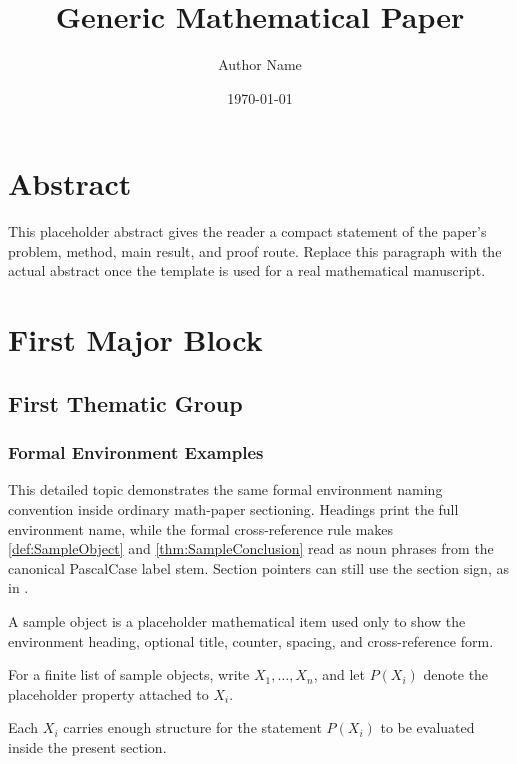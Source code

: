 \documentclass[12pt]{article}
\title{Generic Mathematical Paper}
\author{Author Name}
\date{\today}
\begin{document}
\maketitle
\thispagestyle{plain}
\clearpage
\section*{Abstract}
This placeholder abstract gives the reader a compact statement of the paper's
problem, method, main result, and proof route. Replace this paragraph with the
actual abstract once the template is used for a real mathematical manuscript.

\clearpage
\tableofcontents
\clearpage


\section{First Major Block}
\subsection{First Thematic Group}
\subsubsection{Formal Environment Examples}\label{sec:FormalEnvironmentExamples}
This detailed topic demonstrates the same formal environment naming convention
inside ordinary math-paper sectioning. Headings print the full environment name,
while the formal cross-reference rule makes \cref{def:SampleObject} and
\cref{thm:SampleConclusion} read as noun phrases from the canonical PascalCase
label stem. Section pointers can still use the section sign, as in
.

\begin{definition}\label{def:SampleObject}
A sample object is a placeholder mathematical item used only to show the
environment heading, optional title, counter, spacing, and cross-reference form.
\end{definition}

\begin{notationenv}\label{not:SampleNotation}
For a finite list of sample objects, write \(X_1,\ldots,X_n\), and let
\(P(X_i)\) denote the placeholder property attached to \(X_i\).
\end{notationenv}

\begin{assumption}\label{as:SampleRegularityHypothesis}
Each \(X_i\) carries enough structure for the statement \(P(X_i)\) to be
evaluated inside the present section.
\end{assumption}
\end{document}
